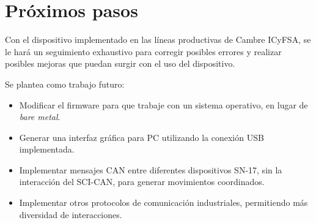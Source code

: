 \section{Próximos pasos}

Con el dispositivo implementado en las líneas productivas de Cambre ICyFSA, se le hará un seguimiento exhaustivo para corregir posibles errores y realizar posibles mejoras que puedan surgir con el uso del dispositivo. 

Se plantea como trabajo futuro:
\begin{itemize}
	\item Modificar el firmware para que trabaje con un sistema operativo, en lugar de \textit{bare metal}.
	\item Generar una interfaz gráfica para PC utilizando la conexión USB implementada.
	\item Implementar mensajes CAN entre diferentes dispositivos SN-17, sin la interacción del SCI-CAN, para generar movimientos coordinados.
	\item Implementar otros protocolos de comunicación industriales, permitiendo más diversidad de interacciones.
\end{itemize}
